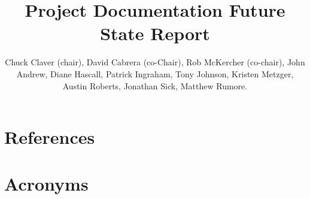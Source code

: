 \documentclass[SE,authoryear,toc]{lsstdoc}
\title{Project Documentation Future State Report}
\author{%
Chuck Claver (chair),
David Cabrera (co-Chair),
Rob McKercher (co-chair),
John Andrew,
Diane Hascall,
Patrick Ingraham,
Tony Johnson,
Kristen Metzger,
Austin Roberts,
Jonathan Sick,
Matthew Rumore.
}
\date{\vcsDate}
\begin{document}
\maketitle





	
	
	


	
	
	
	
	
	
	

	

	


\appendix
\section{References} \label{sec:bib}
\renewcommand{\refname}{} %


\section{Acronyms} \label{sec:acronyms}

\end{document}
